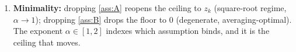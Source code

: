\documentclass[11pt]{article}
\newcommand{\E}{\mathbb{E}}
\begin{document}
\begin{enumerate}
with kernel $\tau_i/A_S$; its bounded variance ratio makes the H\'ajek projection the exact
leading term, rigorizing $\alpha=2$ (Rem.~\ref{rem:hajek}). The realized finite-$G$ risk
satisfies $\E_G[\hat Q_G]=Q_k^{\mathrm{bag},\infty}+\Gamma_k/G$
(Prop.~\ref{prop:finiteG}), with $\Gamma_k$ decreasing in $k$ (small $k$ needs more bags);
in the endogenous case the variance splits as $C_1/T+\Gamma_k/G$, so $G\sim T$ suffices
(Rems.~\ref{rem:G}--\ref{rem:endoG}).
\item \textbf{Minimality:} dropping \ref{ass:A} reopens the ceiling to $z_k$
(square-root regime, $\alpha\to1$); dropping \ref{ass:B} drops the floor to $0$
(degenerate, averaging-optimal). The exponent $\alpha\in[1,2]$ indexes which assumption
binds, and it is the ceiling that moves.
\end{enumerate}
\end{document}
